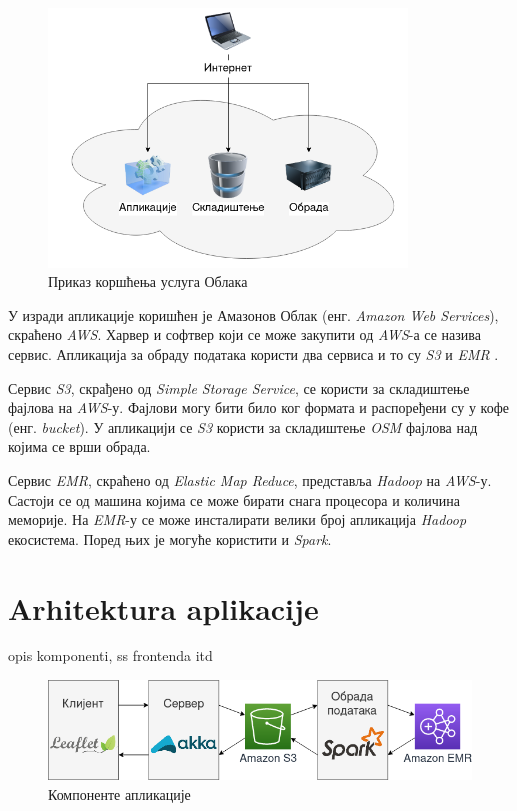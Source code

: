 \documentclass[12pt,oneside]{memoir}
\begin{document}
\begin{figure}[!ht]
  \centering
  \includegraphics[width=0.85\textwidth]{pictures/cloud_computing.png}
  \caption{Приказ коршћења услуга Облака}
  \label{fig:cloud_comp_example}
\end{figure}

У изради апликације коришћен је Амазонов Облак (енг. \textit{Amazon Web Services}), скраћено \textit{AWS}. Харвер и софтвер који се може закупити од \textit{AWS}-а се назива сервис. Апликација за обраду података користи два сервиса и то су \textit{S3} \cite{s3} и \textit{EMR} \cite{emr}.


Сервис \textit{S3}, скрађено од \textit{Simple Storage Service}, се користи за складиштење фајлова на \textit{AWS}-у. Фајлови могу бити било ког формата и распоређени су у кофе (енг. \textit{bucket}). У апликацији се \textit{S3} користи за складиштење \textit{OSM} фајлова над којима се врши обрада.

Сервис \textit{EMR}, скраћено од \textit{Elastic Map Reduce}, представља \textit{Hadoop} на \textit{AWS}-у. Састоји се од машина којима се може бирати снага процесора и количина меморије. На \textit{EMR}-у се може инсталирати велики број апликација \textit{Hadoop} екосистема. Поред њих је могуће користити и \textit{Spark}.

\section{Arhitektura aplikacije}
\label{sec:app_aphi}

opis komponenti, ss frontenda itd

\begin{figure}[!ht]
  \centering
  \includegraphics[width=1\textwidth]{pictures/app_arch_components.png}
  \caption{Компоненте апликације}
  \label{fig:app_components}
\end{figure}
\end{document}
